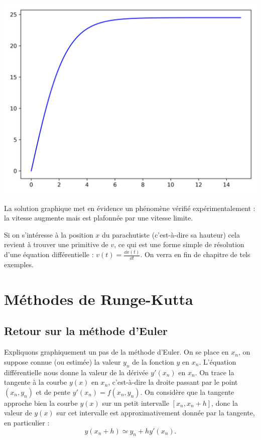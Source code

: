 \documentclass[11pt,class=report,crop=false]{standalone}
\begin{document}
\begin{center}
  \includegraphics[scale=\myscale,scale=0.6]{figures/equadiff-euler-04}
\end{center}
La solution graphique met en évidence un phénomène vérifié expérimentalement : la vitesse augmente mais est plafonnée par une vitesse limite.

\medskip


Si on s'intéresse à la position $x$ du parachutiste (c'est-à-dire sa hauteur) cela revient à trouver une primitive de $v$, ce qui est une forme simple de résolution d'une équation différentielle :
$v(t) = \frac{\dd x(t)}{\dd t}$. On verra en fin de chapitre de tels exemples.


\section{Méthodes de Runge-Kutta}


\subsection{Retour sur la méthode d'Euler}

Expliquons graphiquement un pas de la méthode d'Euler.
On se place en $x_n$, on suppose connue (ou estimée) la valeur $y_n$ de la fonction $y$ en $x_n$.
L'équation différentielle nous donne la valeur de la dérivée $y'(x_n)$ en $x_n$.
On trace la tangente à la courbe $y(x)$ en $x_n$, c'est-à-dire la droite passant par le point $(x_n,y_n)$ et de pente $y'(x_n)=f(x_n,y_n)$.
On considère que la tangente approche bien la courbe $y(x)$ sur un petit intervalle $[x_n,x_n+h]$, donc la valeur de $y(x)$ sur cet intervalle est approximativement donnée par la tangente, en particulier :
$$y(x_n+h) \simeq y_n + h y'(x_n).$$
\end{document}
